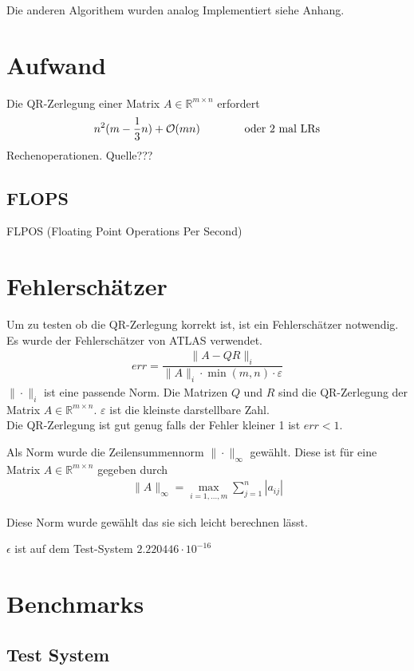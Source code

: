 Die anderen Algorithem wurden analog Implementiert siehe Anhang.


\section{Aufwand}

Die QR-Zerlegung einer Matrix $A \in \mathbb{R}^{m \times n}$  erfordert
\begin{align*}
	n^2(m-\frac{1}{3} n) + {\cal O}(mn) \qquad \qquad \text{oder 2 mal LRs}
\end{align*}
Rechenoperationen. Quelle???

\subsection{FLOPS}
FLPOS (Floating Point Operations Per Second) 

\section{Fehlerschätzer}

Um zu testen ob die QR-Zerlegung korrekt ist, ist ein Fehlerschätzer notwendig.
Es wurde der Fehlerschätzer von ATLAS\cite{atlas} verwendet.
\begin{align}
	err = \dfrac{\|A - QR\|_i}{\|A\|_i \cdot \min(m,n) \cdot \varepsilon}
\end{align}
$\|\cdot\|_i$ ist eine passende Norm.
Die Matrizen $Q$ und $R$ sind die QR-Zerlegung der Matrix $A \in \mathbb{R}^{m \times n}$.
$\varepsilon$ ist die kleinste darstellbare Zahl.\\
Die QR-Zerlegung ist gut genug falls der Fehler kleiner 1 ist $ err < 1 $.

Als Norm wurde die Zeilensummennorm $\|\cdot\|_\infty$ gewählt.
Diese ist für eine Matrix $A \in \mathbb{R}^{m\times n}$ gegeben durch
\begin{align*}
	\|A\|_\infty = \max_{i=1,...,m} \sum_{j=1}^{n} |a_{ij}|
\end{align*}

Diese Norm wurde gewählt das sie sich leicht berechnen lässt.

$\epsilon$ ist auf dem Test-System $2.220446\cdot10^{-16}$


\section{Benchmarks}

\subsection{Test System}

